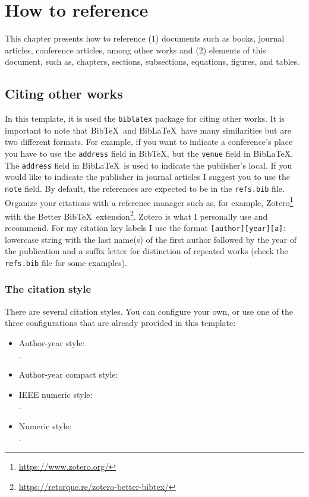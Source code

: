 \chapter{How to reference}
\label{c3}

This chapter presents how to reference (1) documents such as books, journal articles, conference articles, among other works and (2) elements of this document, such as, chapters, sections, subsections, equations, figures, and tables.


\section{Citing other works}
\label{c3:s:citing-other-works}

In this template, it is used the \verb+biblatex+ package for citing other works.
It is important to note that Bib\TeX\ and Bib\LaTeX\ have many similarities but are two different formats.
For example, if you want to indicate a conference's place you have to use the \verb+address+ field in Bib\TeX, but the \verb+venue+ field in Bib\LaTeX.
The \verb+address+ field in Bib\LaTeX\ is used to indicate the publisher's local. If you would like to indicate the publisher in journal articles I suggest you to use the \verb+note+ field.
By default, the references are expected to be in the \verb+refs.bib+ file.
Organize your citations with a reference manager such as, for example, Zotero\footnote{\url{https://www.zotero.org/}} with the Better Bib\TeX\ extension\footnote{\url{https://retorque.re/zotero-better-bibtex/}}.
Zotero is what I personally use and recommend.
For my citation key labels I use the format \texttt{[author][year][a]}: lowercase string with the last name(s) of the first author followed by the year of the publication and a suffix letter for distinction of repeated works (check the \texttt{refs.bib} file for some examples).


\subsection{The citation style}
\label{c3:ss:the-citation-style}

There are several citation styles.
You can configure your own, or use one of the three configurations that are already provided in this template:

\begin{itemize}
\item
Author-year style:\\\verb++.
\item
Author-year compact style:\\\verb++
\item
IEEE numeric style:\\\verb++.
\item
Numeric style:\\\verb++.
\end{itemize}

